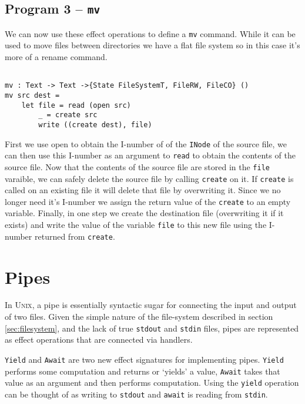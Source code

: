 \documentclass[logo,bsc,singlespacing,parskip]{infthesis}
\begin{document}
\begin{tcolorbox}[colback=gray!10, colframe=black, arc=0pt, outer arc=0pt]
  \section*{Program 3 -- \texttt{mv}}

  We can now use these effect operations to define a \texttt{mv} command. While
  it can be used to move files between directories we have a flat file system
  so in this case it's more of a rename command.

  \begin{lstlisting}[language=unison]

mv : Text -> Text ->{State FileSystemT, FileRW, FileCO} ()
mv src dest = 
    let file = read (open src)
        _ = create src
        write ((create dest), file)

  \end{lstlisting}

  First we use open to obtain the I-number of of the \texttt{INode} of the
  source file, we can then use this I-number as an argument to \texttt{read} to
  obtain the contents of the source file. Now that the contents of the source
  file are stored in the \texttt{file} varaible, we can safely delete the
  source file by calling \texttt{create} on it. If \texttt{create} is called on
  an existing file it will delete that file by overwriting it. Since we no
  longer need it's I-number we assign the return value of the \texttt{create}
  to an empty variable. Finally, in one step we create the destination file
  (overwriting it if it exists) and write the value of the variable
  \texttt{file} to this new file using the I-number returned from
  \texttt{create}.

\end{tcolorbox}

\section{Pipes}

In \textsc{Unix}, a pipe is essentially syntactic sugar for connecting the input
and output of two files. Given the simple nature of the file-system described
in section \ref{sec:filesystem}, and the lack of true \texttt{stdout} and
\texttt{stdin} files, pipes are represented as effect operations that are
connected via handlers.

\texttt{Yield} and \texttt{Await} are two new effect signatures for
implementing pipes. \texttt{Yield} performs some computation and returns or
`yields' a value, \texttt{Await} takes that value as an argument and then
performs computation. Using the \texttt{yield} operation can be thought of as
writing to \texttt{stdout} and \texttt{await} is reading from \texttt{stdin}.
\end{document}
